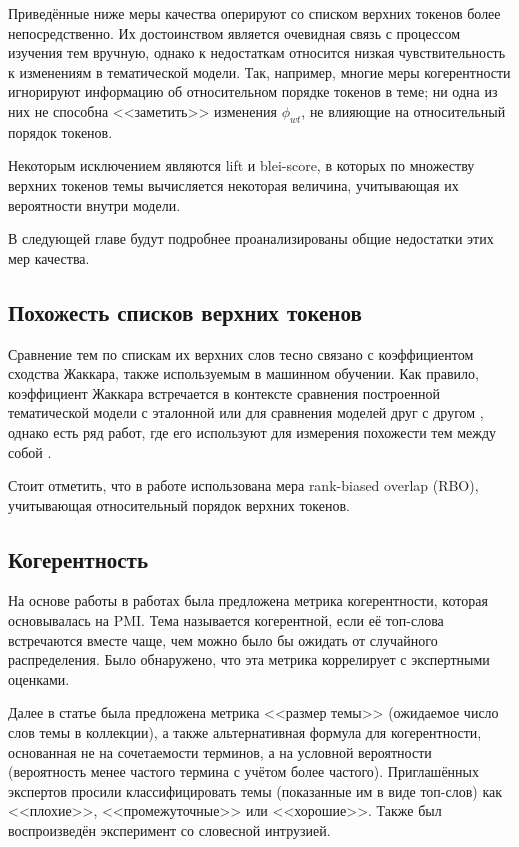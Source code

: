 Приведённые ниже меры качества оперируют со списком верхних токенов более непосредственно. Их достоинством является очевидная связь с процессом изучения тем вручную, однако к недостаткам относится низкая чувствительность к изменениям в тематической модели. Так, например, многие меры когерентности игнорируют информацию об относительном порядке токенов в теме; ни одна из них не способна <<заметить>> изменения $\phi_{wt}$, не влияющие на относительный порядок токенов.

Некоторым исключением являются lift и blei-score, в которых по множеству верхних токенов темы вычисляется некоторая величина, учитывающая их вероятности внутри модели.

В следующей главе будут подробнее проанализированы общие недостатки этих мер качества.

\subsection{Похожесть списков верхних токенов}
Сравнение тем по спискам их верхних слов тесно связано с коэффициентом сходства Жаккара, также используемым в машинном обучении. Как правило, коэффициент Жаккара встречается в контексте сравнения построенной тематической модели с эталонной \cite{greene14howmany} или для сравнения моделей друг с другом \cite{mantyla2018measuring}, однако есть ряд работ, где его используют для измерения похожести тем между собой \cite{bulatov,yanginferring}.

Стоит отметить, что в работе \cite{mantyla2018measuring} использована мера rank-biased overlap (RBO), учитывающая относительный порядок верхних токенов.

\subsection{Когерентность}
На основе работы \cite{rtl} в работах \cite{newman2009,newman2010automatic} была предложена метрика когерентности, которая основывалась на PMI. Тема называется когерентной, если её топ-слова встречаются вместе чаще, чем можно было бы ожидать от случайного распределения. Было обнаружено, что эта метрика коррелирует с экспертными оценками.

Далее в статье \cite{mimno2011} была предложена метрика <<размер темы>> (ожидаемое число слов темы в коллекции), а также альтернативная формула для когерентности, основанная не на сочетаемости терминов, а на условной вероятности (вероятность менее частого термина с учётом более частого). Приглашённых экспертов просили классифицировать темы (показанные им в виде топ-слов) как <<плохие>>, <<промежуточные>> или <<хорошие>>. Также был воспроизведён эксперимент со словесной интрузией.

